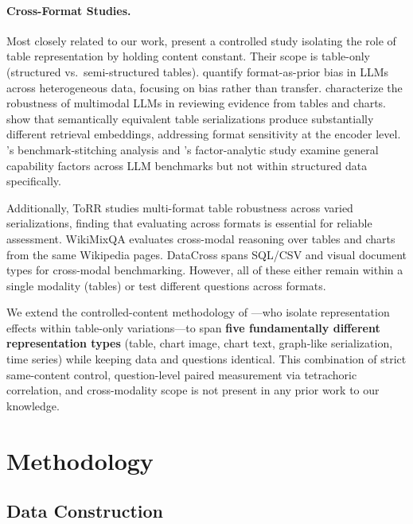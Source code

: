 \documentclass[11pt]{article}
\begin{document}
\paragraph{Cross-Format Studies.} Most closely related to our work, \citet{zhang2026samecontent} present a controlled study isolating the role of table representation by holding content constant. Their scope is table-only (structured vs.\ semi-structured tables). \citet{liu2025formatprior} quantify format-as-prior bias in LLMs across heterogeneous data, focusing on bias rather than transfer. \citet{ho2025formatmatters} characterize the robustness of multimodal LLMs in reviewing evidence from tables and charts. \citet{bhandari2026tabular} show that semantically equivalent table serializations produce substantially different retrieval embeddings, addressing format sensitivity at the encoder level. \citet{epoch2026}'s benchmark-stitching analysis and \citet{ilic2023gfactor}'s factor-analytic study examine general capability factors across LLM benchmarks but not within structured data specifically.

Additionally, ToRR \cite{torr2026} studies multi-format table robustness across varied serializations, finding that evaluating across formats is essential for reliable assessment. WikiMixQA \cite{wikimixqa2025} evaluates cross-modal reasoning over tables and charts from the same Wikipedia pages. DataCross \cite{datacross2026} spans SQL/CSV and visual document types for cross-modal benchmarking. However, all of these either remain within a single modality (tables) or test different questions across formats.

We extend the controlled-content methodology of \citet{zhang2026samecontent}---who isolate representation effects within table-only variations---to span \textbf{five fundamentally different representation types} (table, chart image, chart text, graph-like serialization, time series) while keeping data and questions identical. This combination of strict same-content control, question-level paired measurement via tetrachoric correlation, and cross-modality scope is not present in any prior work to our knowledge.

\section{Methodology}

\subsection{Data Construction}
\end{document}
